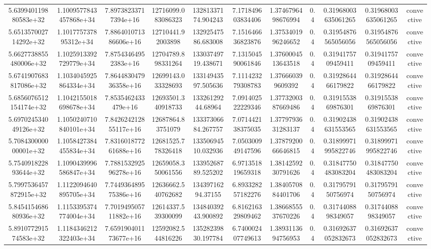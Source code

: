 \begin{table}
\begin{tabular}{ccccccccccc}
5.639940119880583e+32 & 1.1009577843457868e+34 & 7.89738233717394e+16 & 12716099.083086323 & 13281337174.904243 & 7.171849603834406 & 1.3746796498676994 & 0.4 & 0.31968003635061265 & 0.31968003635061265 & convective \\
5.651357002714292e+32 & 1.101775737895312e+34 & 7.886401071386606e+16 & 12710441.92003898 & 13292547586.683008 & 7.151646636823876 & 1.3753401996246652 & 0.4 & 0.31954876565056056 & 0.31954876565056056 & convective \\
5.6627738855480006e+32 & 1.1025913392729779e+34 & 7.87543464952383e+16 & 12704789.898331264 & 13303749719.438671 & 7.131504590061846 & 1.3760004513643518 & 0.4 & 0.3194175709459411 & 0.3194175709459411 & convective \\
5.6741907683817086e+32 & 1.1034045925864334e+34 & 7.864483047936358e+16 & 12699143.033328693 & 13314943597.505636 & 7.111423279308783 & 1.376660399609392 & 0.4 & 0.3192864466179822 & 0.3192864466179822 & convective \\
5.6856076512154174e+32 & 1.1042155018698678e+34 & 7.8535462433479e+16 & 12693501.340918733 & 13326129244.68964 & 7.091402522229346 & 1.3773200387669486 & 0.4 & 0.3191553869876301 & 0.3191553869876301 & convective \\
5.697024534049126e+32 & 1.1050240710840101e+34 & 7.842624212855117e+16 & 12687864.83751079 & 13337306684.267757 & 7.071442138375035 & 1.3779793631283137 & 0.4 & 0.31902438631553565 & 0.31902438631553565 & convective \\
5.708430000000001e+32 & 1.1058427384455834e+34 & 7.831601877261688e+16 & 12681525.778326418 & 13350694510.032936 & 7.050300949147596 & 1.3787920066646815 & 0.4 & 0.31899971995822746 & 0.31899971995822746 & convective \\
5.754091822893644e+32 & 1.1090439996586847e+34 & 7.788153292596278e+16 & 12659058.350061556 & 13395268789.525202 & 6.971351819659318 & 1.3814259230791626 & 0.4 & 0.31847750483083204 & 0.31847750483083204 & convective \\
5.7997536457872915e+32 & 1.1122094640895705e+34 & 7.744936489575386e+16 & 12636662.540762682 & 13439716294.37155 & 6.893328257182276 & 1.3840570884401706 & 0.4 & 0.3179579150756974 & 0.3179579150756974 & convective \\
5.845415468680936e+32 & 1.1153395374774004e+34 & 7.701949505711882e+16 & 12614337.539300099 & 13484039243.900892 & 6.816216329809462 & 1.3866855537670226 & 0.4 & 0.3174408898349057 & 0.3174408898349057 & convective \\
5.891077291574583e+32 & 1.1184346212322403e+34 & 7.659190401173677e+16 & 12592082.544816226 & 13528239830.197784 & 6.740002407749613 & 1.3893113694756953 & 0.4 & 0.31692637052832673 & 0.31692637052832673 & convective \\

\end{tabular}
\end{table}
